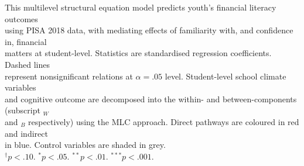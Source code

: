{
}{ %
    This multilevel structural equation model predicts youth's financial literacy outcomes\\
    using PISA 2018 data, with mediating effects of familiarity with, and confidence in, financial\\
    matters at student-level. Statistics are standardised regression coefficients. Dashed lines\\
    represent nonsignificant relations at $\alpha=.05$ level. Student-level school climate variables\\
    and cognitive outcome are decomposed into the within- and between-components (subscript $_W$\\
    and $_B$ respectively) using the MLC approach. Direct pathways are coloured in red and indirect\\
    in blue. Control variables are shaded in grey.\\
$^\dagger p < .10$. $^* p < .05$. $^{**} p < .01$. $^{***} p < .001$.}
